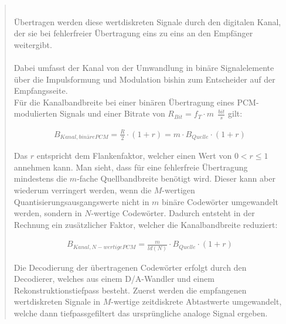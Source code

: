 \begin{quote}
	 \\
	Übertragen werden diese wertdiskreten Signale durch den digitalen Kanal, der
	sie bei fehlerfreier Übertragung eins zu eins an den Empfänger weitergibt. \\
	 \\
	Dabei umfasst der Kanal von der Umwandlung in binäre Signalelemente über die
	Impulsformung und Modulation bishin zum Entscheider auf der Empfangsseite.\\
	Für die Kanalbandbreite bei einer binären Übertragung eines PCM-modulierten
	Signals und einer Bitrate von $R_{Bit} = f_T \cdot m \ \ \frac{bit}{s}$ gilt:
	 
       \begin{equation*}
        	\begin{split}
        		B_{Kanal,binäre PCM} = \frac{R}{2} \cdot (1+r)  =  m \cdot
        		B_{Quelle} \cdot (1+r)
        	\end{split}
        \end{equation*}        
        
	\vspace{0.5em}
	    
	Das $r$ entspricht dem Flankenfaktor, welcher einen Wert von $0 < r \leq 1$
	annehmen kann. Man sieht, dass für eine fehlerfreie Übertragung mindestens die
	 $m$-fache Quellbandbreite benötigt wird. Dieser kann aber wiederum verringert werden, wenn die $M$-wertigen
	Quantisierungsausgangswerte nicht in $m$ binäre Codewörter umgewandelt werden,
	sondern in $N$-wertige Codewörter. Dadurch entsteht in der Rechnung ein
	zusätzlicher Faktor, welcher die Kanalbandbreite reduziert:
	
	 \begin{equation*}
        	\begin{split}
        		B_{Kanal,N-wertige PCM} = \frac{m}{ld(N)} \cdot B_{Quelle} \cdot (1+r)
        	\end{split}
      \end{equation*}     
	
	\vspace{0.5em}
	
	Die Decodierung der übertragenen Codewörter erfolgt durch den Decodierer,
	welches aus einem D/A-Wandler und einem Rekonstruktionstiefpass besteht. Zuerst
	werden die empfangenen wertdiskreten Signale in $M$-wertige zeitdiskrete Abtastwerte
	umgewandelt, welche dann tiefpassgefiltert das ursprüngliche analoge Signal
	ergeben.\\
	

\end{quote}
